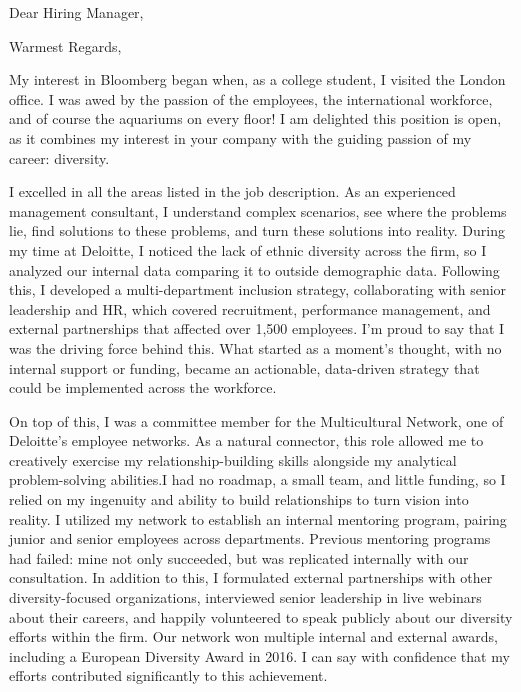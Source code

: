 \documentclass[11pt,a4paper,sans]{moderncv}        %
\begin{document}
\date{\today}
\opening{Dear Hiring Manager,}
\closing{Warmest Regards,}
\makelettertitle

My interest in Bloomberg began when, as a college student, I visited the London
office. I was awed by the passion of the employees, the international
workforce, and of course the aquariums on every floor! I am delighted this
position is open, as it combines my interest in your company with the guiding
passion of my career: diversity. 
 
I excelled in all the areas listed in the job description. As an
experienced management consultant, I understand complex scenarios, see where
the problems lie, find solutions to these problems, and turn these solutions
into reality. During my time at Deloitte, I noticed the lack of ethnic
diversity across the firm, so I analyzed our internal data comparing it to
outside demographic data. Following this, I developed a multi-department
inclusion strategy, collaborating with senior leadership and HR, which covered
recruitment, performance management, and external partnerships that affected
over 1,500 employees. I’m proud to say that I was the driving force behind
this. What started as a moment’s thought, with no internal support or funding,
became an actionable, data-driven strategy that could be implemented across the
workforce.

On top of this, I was a committee member for the Multicultural Network, one of
Deloitte’s employee networks. As a natural connector, this role allowed me to
creatively exercise my relationship-building skills alongside my analytical
problem-solving abilities.I had no roadmap, a small team, and little funding,
so I relied on my ingenuity and ability to build relationships to turn vision
into reality. I utilized my network to establish an internal mentoring program,
pairing junior and senior employees across departments. Previous mentoring
programs had failed: mine not only succeeded, but was replicated internally
with our consultation. In addition to this, I formulated external partnerships
with other diversity-focused organizations, interviewed senior leadership in
live webinars about their careers, and happily volunteered to speak publicly
about our diversity efforts within the firm. Our network won multiple internal
and external awards, including a European Diversity Award in 2016. I can say
with confidence that my efforts contributed significantly to this achievement.
\end{document}
